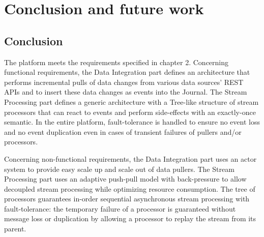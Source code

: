 \chapter{Conclusion and future work}

\section{Conclusion}

The platform meets the requirements specified in chapter 2. 
Concerning functional requirements, the Data Integration part defines an architecture that performs incremental pulls of data changes from various data sources' REST APIs and to insert these data changes as events into the Journal. The Stream Processing part defines a generic architecture with a Tree-like structure of stream processors that can react to events and perform side-effects with an exactly-once semantic. In the entire platform, fault-tolerance is handled to ensure no event loss and no event duplication even in cases of transient failures of pullers and/or processors.

Concerning non-functional requirements, the Data Integration part uses an actor system to provide easy scale up and scale out of data pullers. The Stream Processing part uses an adaptive push-pull model with back-pressure to allow decoupled stream processing while optimizing resource consumption. The tree of processors guarantees in-order sequential asynchronous stream processing with fault-tolerance: the temporary failure of a processor is guaranteed without message loss or duplication by allowing a processor to replay the stream from its parent.
\\

